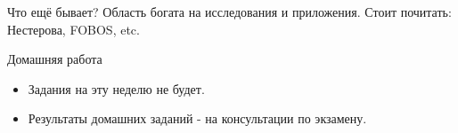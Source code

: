 \documentclass[14pt, fleqn, xcolor={dvipsnames, table}]{beamer}
\begin{document}
\begin{frame}{Что ещё бывает?}
Область богата на исследования и приложения. Стоит почитать: Нестерова, FOBOS, etc.
\end{frame}



\begin{frame}{Домашняя работа}
\begin{itemize}
  \item Задания на эту неделю не будет.
  \item Результаты домашних заданий - на консультации по экзамену.
\end{itemize}
\end{frame}
\end{document}
